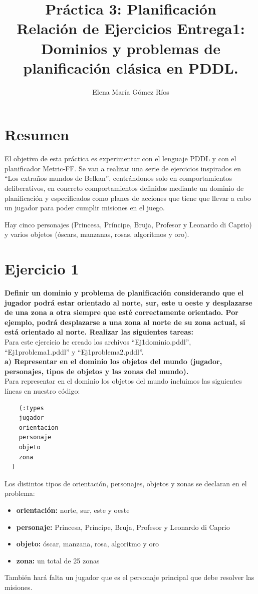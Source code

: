 \documentclass[12pt]{article}
\title{\vspace{4cm}
Práctica 3: Planificación\\
\vspace{1cm}
Relación de Ejercicios Entrega1:\\
Dominios y problemas de planificación
clásica en PDDL.}
\author{ Elena María Gómez Ríos }
\begin{document}
\maketitle
\newpage
\tableofcontents
\newpage

\section{Resumen}
El objetivo de esta práctica es experimentar con el lenguaje PDDL y con el planificador Metric-FF. Se van a realizar una serie de ejercicios inspirados en ``Los extraños mundos de Belkan'', centrándonos solo en comportamientos deliberativos, en concreto comportamientos definidos mediante un dominio de planificación y especificados como planes de acciones que tiene que llevar a cabo un jugador para poder cumplir misiones en el juego.

Hay cinco personajes (Princesa, Príncipe, Bruja, Profesor y Leonardo di Caprio) y varios objetos (óscars, manzanas, rosas, algoritmos y oro).

\section{Ejercicio 1} \textbf{Definir un dominio y problema de planificación considerando que el jugador podrá estar orientado al norte, sur, este u oeste y desplazarse de una zona a otra siempre que esté correctamente orientado. Por ejemplo, podrá desplazarse a una zona al norte de su zona actual, si está orientado al norte. Realizar las siguientes tareas:}\\

Para este ejercicio he creado los archivos ``Ej1dominio.pddl'', ``Ej1problema1.pddl'' y ``Ej1problema2.pddl''.\\

\textbf{a) Representar en el dominio los objetos del mundo (jugador, personajes, tipos de objetos y las zonas del mundo).}\\

Para representar en el dominio los objetos del mundo incluimos las siguientes líneas en nuestro código:

\begin{verbatim}
    (:types
    jugador
    orientacion
    personaje
    objeto
    zona
  )
\end{verbatim}

Los distintos tipos de orientación, personajes, objetos y zonas se declaran en el problema:
\begin{itemize}
	\item \textbf{orientación:} norte, sur, este y oeste
	\item \textbf{personaje:} Princesa, Príncipe, Bruja, Profesor y Leonardo di Caprio
	\item \textbf{objeto:} óscar, manzana, rosa, algoritmo y oro
	\item \textbf{zona:} un total de 25 zonas
\end{itemize}
También hará falta un jugador que es el personaje principal que debe resolver las misiones.\\
\end{document}
